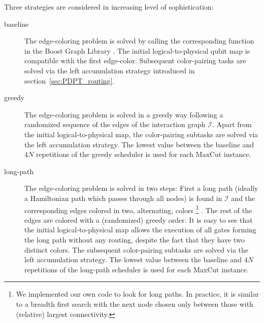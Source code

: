 \documentclass[%
onecolumn,pra,
superscriptaddress,
nofootinbib,
 amsmath,amssymb,
 aps,
11pt,
]{revtex4-1}
\def\note#1{\textbf{\color{red}[#1]}}
\begin{document}
Three strategies are considered in increasing level of sophistication:
\begin{description}
\item[baseline] The edge-coloring problem is solved by calling the corresponding function in the Boost Graph Library \cite{2002:BGL:504206}. The initial logical-to-physical qubit map is compatible with the first edge-color. Subsequent color-pairing tasks are solved via the left accumulation strategy introduced in section~\ref{sec:PDPT_routing}.
\item[greedy] The edge-coloring problem is solved in a greedy way following a randomized sequence of the edges of the interaction graph $\mathcal{I}$. Apart from the initial logical-to-physical map, the color-pairing subtasks are solved via the left accumulation strategy. The lowest value between the baseline and $4 N$ repetitions of the greedy scheduler is used for each MaxCut instance.
\item[long-path] The edge-coloring problem is solved in two steps: First a long path (ideally a Hamiltonian path which passes through all nodes) is found in $\mathcal{I}$ and the corresponding edges colored in two, alternating, colors%
\footnote{We implemented our own code to look for long paths. In practice, it is similar to a breadth first search with the next node chosen only between those with (relative) largest connectivity.}%
. The rest of the edges are colored with a (randomized) greedy order.
It is easy to see that the initial logical-to-physical map allows the execution of all gates forming the long path without any routing, despite the fact that they have two distinct colors. The subsequent color-pairing subtasks are solved via the left accumulation strategy. The lowest value between the baseline and $4 N$ repetitions of the long-path scheduler is used for each MaxCut instance.
\end{description}
\end{document}
